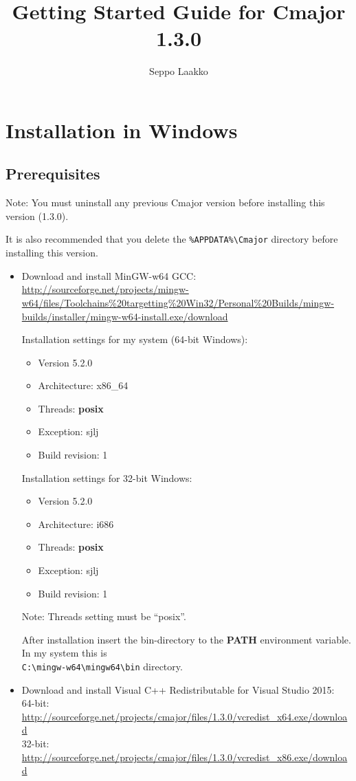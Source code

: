 \documentclass[oneside, a4paper, 11pt]{article}
\begin{document}
\title{Getting Started Guide for Cmajor 1.3.0}
\author{Seppo Laakko}
\maketitle

\section{Installation in Windows}

\subsection{Prerequisites}

Note:
You must uninstall any previous Cmajor version before installing
this version (1.3.0).

It is also recommended that you delete the
\verb|%APPDATA%\Cmajor| directory before installing
this version.

\begin{itemize}

\item
Download and install MinGW-w64 GCC:\\
\url{http://sourceforge.net/projects/mingw-w64/files/Toolchains%20targetting%20Win32/Personal%20Builds/mingw-builds/installer/mingw-w64-install.exe/download}

Installation settings for my system (64-bit Windows):
\begin{itemize}
\item
Version 5.2.0
\item
Architecture: x86\_64
\item
Threads: \textbf{posix}
\item
Exception: sjlj
\item
Build revision: 1
\end{itemize}

Installation settings for 32-bit Windows:
\begin{itemize}
\item
Version 5.2.0
\item
Architecture: i686
\item
Threads: \textbf{posix}
\item
Exception: sjlj
\item
Build revision: 1
\end{itemize}

Note: Threads setting must be ``posix''.

After installation insert the bin-directory to the \textbf{PATH} environment variable.
In my system this is\\
\verb|C:\mingw-w64\mingw64\bin| directory.

\item
Download and install Visual C++ Redistributable for Visual Studio 2015:\\
64-bit: \url{http://sourceforge.net/projects/cmajor/files/1.3.0/vcredist_x64.exe/download}\\
32-bit: \url{http://sourceforge.net/projects/cmajor/files/1.3.0/vcredist_x86.exe/download}
\end{itemize}
\end{document}
